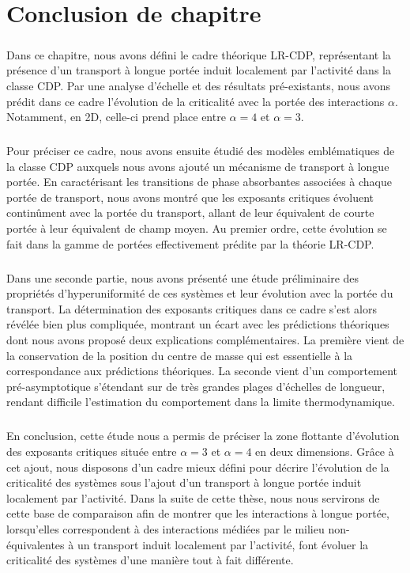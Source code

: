 \section{Conclusion de chapitre}

\subparagraph{}Dans ce chapitre, nous avons défini le cadre théorique LR-CDP, représentant la présence d'un transport à longue portée induit localement par l'activité dans la classe CDP. Par une analyse d'échelle et des résultats pré-existants, nous avons prédit dans ce cadre l'évolution de la criticalité avec la portée des interactions $\alpha$. Notamment, en 2D, celle-ci prend place entre $\alpha=4$ et $\alpha=3$.


\subparagraph{}Pour préciser ce cadre, nous avons ensuite étudié des modèles emblématiques de la classe CDP auxquels nous avons ajouté un mécanisme de transport à longue portée. En caractérisant les transitions de phase absorbantes associées à chaque portée de transport, nous avons montré que les exposants critiques évoluent continûment avec la portée du transport, allant de leur équivalent de courte portée à leur équivalent de champ moyen. Au premier ordre, cette évolution se fait dans la gamme de portées effectivement prédite par la théorie LR-CDP.

\subparagraph{}Dans une seconde partie, nous avons présenté une étude préliminaire des propriétés d'hyperuniformité de ces systèmes et leur évolution avec la portée du transport. La détermination des exposants critiques dans ce cadre s'est alors révélée bien plus compliquée, montrant un écart avec les prédictions théoriques dont nous avons proposé deux explications complémentaires. La première vient de la conservation de la position du centre de masse qui est essentielle à la correspondance aux prédictions théoriques. La seconde vient d'un comportement pré-asymptotique s'étendant sur de très grandes plages d'échelles de longueur, rendant difficile l'estimation du comportement dans la limite thermodynamique.

\subparagraph{}En conclusion, cette étude nous a permis de préciser la zone flottante d'évolution des exposants critiques située entre $\alpha=3$ et $\alpha = 4$ en deux dimensions. Grâce à cet ajout, nous disposons d'un cadre mieux défini pour décrire l'évolution de la criticalité des systèmes sous l'ajout d'un transport à longue portée induit localement par l'activité. Dans la suite de cette thèse, nous nous servirons de cette base de comparaison afin de montrer que les interactions à longue portée, lorsqu'elles correspondent à des interactions médiées par le milieu non-équivalentes à un transport induit localement par l'activité, font évoluer la criticalité des systèmes d'une manière tout à fait différente.

